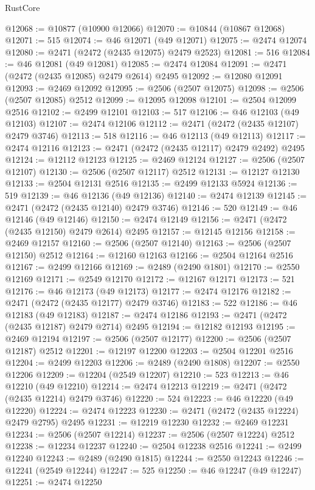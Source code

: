 \begin{lexlean}{RustCore}
\begin{coremodule}
@12068 := @10877 (@10900 @12066)
@12070 := @10844 (@10867 @12068)
@12071 := 515
@12074 := @46 @12071 (@49 @12071)
@12075 := @2474 @12074
@12080 := @2471 (@2472 (@2435 @12075) @2479 @2523)
@12081 := 516
@12084 := @46 @12081 (@49 @12081)
@12085 := @2474 @12084
@12091 := @2471 (@2472 (@2435 @12085) @2479 @2614) @2495
@12092 := @12080 @12091
@12093 := @2469 @12092
@12095 := @2506 (@2507 @12075)
@12098 := @2506 (@2507 @12085) @2512
@12099 := @12095 @12098
@12101 := @2504 @12099 @2516
@12102 := @2499 @12101
@12103 := 517
@12106 := @46 @12103 (@49 @12103)
@12107 := @2474 @12106
@12112 := @2471 (@2472 (@2435 @12107) @2479 @3746)
@12113 := 518
@12116 := @46 @12113 (@49 @12113)
@12117 := @2474 @12116
@12123 := @2471 (@2472 (@2435 @12117) @2479 @2492) @2495
@12124 := @12112 @12123
@12125 := @2469 @12124
@12127 := @2506 (@2507 @12107)
@12130 := @2506 (@2507 @12117) @2512
@12131 := @12127 @12130
@12133 := @2504 @12131 @2516
@12135 := @2499 @12133 @5924
@12136 := 519
@12139 := @46 @12136 (@49 @12136)
@12140 := @2474 @12139
@12145 := @2471 (@2472 (@2435 @12140) @2479 @3746)
@12146 := 520
@12149 := @46 @12146 (@49 @12146)
@12150 := @2474 @12149
@12156 := @2471 (@2472 (@2435 @12150) @2479 @2614) @2495
@12157 := @12145 @12156
@12158 := @2469 @12157
@12160 := @2506 (@2507 @12140)
@12163 := @2506 (@2507 @12150) @2512
@12164 := @12160 @12163
@12166 := @2504 @12164 @2516
@12167 := @2499 @12166
@12169 := @2489 (@2490 @1801)
@12170 := @2550 @12169
@12171 := @2549 @12170
@12172 := @12167 @12171
@12173 := 521
@12176 := @46 @12173 (@49 @12173)
@12177 := @2474 @12176
@12182 := @2471 (@2472 (@2435 @12177) @2479 @3746)
@12183 := 522
@12186 := @46 @12183 (@49 @12183)
@12187 := @2474 @12186
@12193 := @2471 (@2472 (@2435 @12187) @2479 @2714) @2495
@12194 := @12182 @12193
@12195 := @2469 @12194
@12197 := @2506 (@2507 @12177)
@12200 := @2506 (@2507 @12187) @2512
@12201 := @12197 @12200
@12203 := @2504 @12201 @2516
@12204 := @2499 @12203
@12206 := @2489 (@2490 @1808)
@12207 := @2550 @12206
@12209 := @12204 (@2549 @12207)
@12210 := 523
@12213 := @46 @12210 (@49 @12210)
@12214 := @2474 @12213
@12219 := @2471 (@2472 (@2435 @12214) @2479 @3746)
@12220 := 524
@12223 := @46 @12220 (@49 @12220)
@12224 := @2474 @12223
@12230 := @2471 (@2472 (@2435 @12224) @2479 @2795) @2495
@12231 := @12219 @12230
@12232 := @2469 @12231
@12234 := @2506 (@2507 @12214)
@12237 := @2506 (@2507 @12224) @2512
@12238 := @12234 @12237
@12240 := @2504 @12238 @2516
@12241 := @2499 @12240
@12243 := @2489 (@2490 @1815)
@12244 := @2550 @12243
@12246 := @12241 (@2549 @12244)
@12247 := 525
@12250 := @46 @12247 (@49 @12247)
@12251 := @2474 @12250

\end{coremodule}
\end{lexlean}

